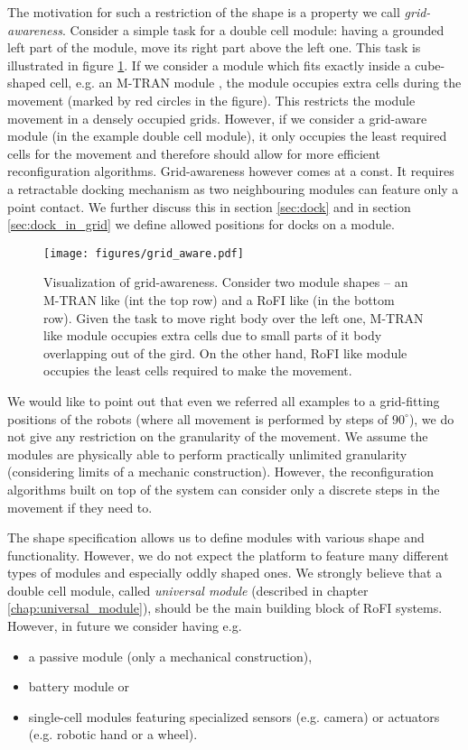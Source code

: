 The motivation for such a restriction of the shape is a property we call
\emph{grid-awareness}. Consider a simple task for a double cell module: having a
grounded left part of the module, move its right part above the left one. This
task is illustrated in figure \ref{fig:grid_aware}. If we consider a module
which fits exactly inside a cube-shaped cell, e.g. an M-TRAN module
\cite{haruhisa_kurokawa_m-tran_2003}, the module occupies extra cells during the
movement (marked by red circles in the figure). This restricts the module
movement in a densely occupied grids. However, if we consider a grid-aware
module (in the example double cell module), it only occupies the least required
cells for the movement and therefore should allow for more efficient
reconfiguration algorithms. Grid-awareness however comes at a const. It requires
a retractable docking mechanism as two neighbouring modules can feature only a
point contact. We further discuss this in section \ref{sec:dock} and in section
\ref{sec:dock_in_grid} we define allowed positions for docks on a module.

\begin{figure}[h!]
    \centering
    \texttt{[image: figures/grid\_aware.pdf]}
    \caption{Visualization of grid-awareness. Consider two module shapes -- an
    M-TRAN\cite{haruhisa_kurokawa_m-tran_2003} like (int the top row) and a RoFI
    like (in the bottom row). Given the task to move right body over the left
    one, M-TRAN like module occupies extra cells due to small parts of it body
    overlapping out of the gird. On the other hand, RoFI like module occupies
    the least cells required to make the movement. }
    \label{fig:grid_aware}
\end{figure}

We would like to point out that even we referred all examples to a grid-fitting
positions of the robots (where all movement is performed by steps of
$90^\circ$), we do not give any restriction on the granularity of the movement.
We assume the modules are physically able to perform practically unlimited
granularity (considering limits of a mechanic construction). However, the
reconfiguration algorithms built on top of the system can consider only a
discrete steps in the movement if they need to.

The shape specification allows us to define modules with various shape and
functionality. However, we do not expect the platform to feature many different
types of modules and especially oddly shaped ones. We strongly believe that a
double cell module, called \emph{universal module} (described in chapter
\ref{chap:universal_module}), should be the main building block of RoFI systems.
However, in future we consider having e.g.
\begin{itemize}
    \item a passive module (only a mechanical construction),
    \item battery module or
    \item single-cell modules featuring specialized sensors (e.g. camera) or
    actuators (e.g. robotic hand or a wheel).
\end{itemize}


